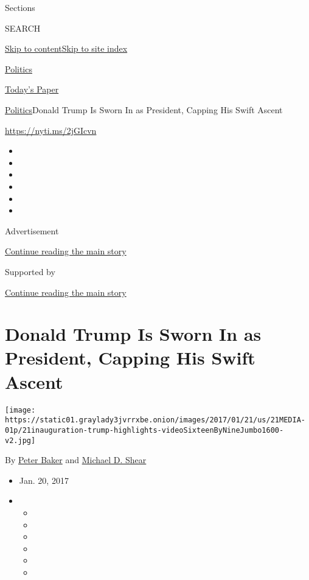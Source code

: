 Sections

SEARCH

\protect\hyperlink{site-content}{Skip to
content}\protect\hyperlink{site-index}{Skip to site index}

\href{https://www.nytimes3xbfgragh.onion/section/politics}{Politics}

\href{https://myaccount.nytimes3xbfgragh.onion/auth/login?response_type=cookie\&client_id=vi}{}

\href{https://www.nytimes3xbfgragh.onion/section/todayspaper}{Today's
Paper}

\href{/section/politics}{Politics}\textbar{}Donald Trump Is Sworn In as
President, Capping His Swift Ascent

\url{https://nyti.ms/2jGIcvn}

\begin{itemize}
\item
\item
\item
\item
\item
\item
\end{itemize}

Advertisement

\protect\hyperlink{after-top}{Continue reading the main story}

Supported by

\protect\hyperlink{after-sponsor}{Continue reading the main story}

\hypertarget{donald-trump-is-sworn-in-as-president-capping-his-swift-ascent}{%
\section{Donald Trump Is Sworn In as President, Capping His Swift
Ascent}\label{donald-trump-is-sworn-in-as-president-capping-his-swift-ascent}}

\texttt{[image: https://static01.graylady3jvrrxbe.onion/images/2017/01/21/us/21MEDIA-01p/21inauguration-trump-highlights-videoSixteenByNineJumbo1600-v2.jpg]}

By \href{http://www.nytimes3xbfgragh.onion/by/peter-baker}{Peter Baker}
and \href{http://www.nytimes3xbfgragh.onion/by/michael-d-shear}{Michael
D. Shear}

\begin{itemize}
\item
  Jan. 20, 2017
\item
  \begin{itemize}
  \item
  \item
  \item
  \item
  \item
  \item
  \end{itemize}
\end{itemize}

